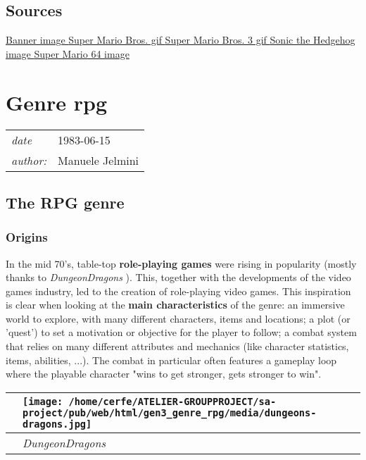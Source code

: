 \documentclass[a4paper,10pt]{book}
\newcommand{\pageHeader}[4]{
    \section{#1}
    \vspace{-0.3cm}
    \begin{table}[h!]
     \begin{tabular}{ll}
        \hline
        \textit{date} & #2 \\
        \textit{author: } & #3\\
        \hline
     \end{tabular}
    \end{table}
    \vspace{-0.3cm}
}
\begin{document}
 
 \subsection{Sources }
 \href{https://1.bp.blogspot.com/-Oe69TRcamcs/Vwk9tdW9V1I/AAAAAAAAHQk/KKJjynquuBse8lAmOcYH_nX8llVyVavIA/s640/platform-games.jpg}{Banner image }  
 \href{https://hips.hearstapps.com/digitalspyuk.cdnds.net/17/30/1501241488-super-mario-bros.gif}{Super Mario Bros. gif }  
 \href{https://i.pinimg.com/originals/ef/38/b8/ef38b8ee58ec882e70a415590d4c5937.gif}{Super Mario Bros. 3 gif }  
 \href{https://www.retrogames.cz/games/117/Genesis_02.gif}{Sonic the Hedgehog image }  
 \href{https://cdn.collider.com/wp-content/uploads/2019/10/super-mario-64.png}{Super Mario 64 image }  
 \newpage\pageHeader{Genre rpg}{1983-06-15}{Manuele Jelmini}{A look at role-playing games and their confusing classification}
 \subsection{The RPG genre }
 
 \subsubsection{Origins }
 
 
          In the mid 70's, table-top  \textbf{role-playing games }  were rising in popularity (mostly thanks to  \textit{DungeonDragons }). This, together with the developments of the video games industry, led to the creation of role-playing video games.
          This inspiration is clear when looking at the  \textbf{main characteristics }  of the genre: an immersive world to explore, with many different characters, items and locations; a plot (or 'quest')
          to set a motivation or objective for the player to follow; a combat system that relies on many different attributes and mechanics (like character statistics, items, abilities, ...).
          The combat in particular often features a gameplay loop where the playable character "wins to get stronger, gets stronger to win".  
 
 
 \begin{longtable}{p{1mm}|l|}\hline
 
 & \texttt{[image: /home/cerfe/ATELIER-GROUPPROJECT/sa-project/pub/web/html/gen3\_genre\_rpg/media/dungeons-dragons.jpg]}
 \\\hline
 
 & \textit{DungeonDragons }
 \\\hline
 \end{longtable}
 
\end{document}
